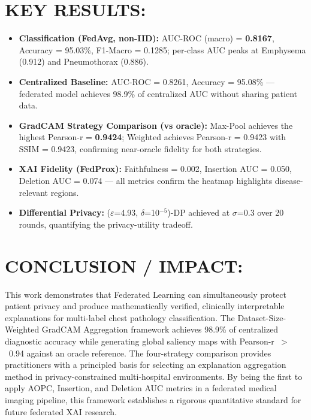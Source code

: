\documentclass[10pt,a4paper]{article}
\begin{document}
\section*{KEY RESULTS:}
\begin{itemize}
  \item \textbf{Classification (FedAvg, non-IID):} AUC-ROC (macro) = \textbf{0.8167},
        Accuracy = 95.03\%, F1-Macro = 0.1285; per-class AUC peaks at Emphysema (0.912)
        and Pneumothorax (0.886).
  \item \textbf{Centralized Baseline:} AUC-ROC = 0.8261, Accuracy = 95.08\% --- federated model
        achieves 98.9\% of centralized AUC without sharing patient data.
  \item \textbf{GradCAM Strategy Comparison (vs oracle):} Max-Pool achieves the highest Pearson-r =
        \textbf{0.9424}; Weighted achieves Pearson-r = 0.9423 with SSIM = 0.9423, confirming
        near-oracle fidelity for both strategies.
  \item \textbf{XAI Fidelity (FedProx):} Faithfulness = 0.002, Insertion AUC = 0.050,
        Deletion AUC = 0.074 --- all metrics confirm the heatmap highlights disease-relevant regions.
  \item \textbf{Differential Privacy:} ($\varepsilon$=4.93, $\delta$=10$^{-5}$)-DP achieved at
        $\sigma$=0.3 over 20 rounds, quantifying the privacy-utility tradeoff.
\end{itemize}

\section*{CONCLUSION / IMPACT:}
This work demonstrates that Federated Learning can simultaneously protect patient privacy and produce
mathematically verified, clinically interpretable explanations for multi-label chest pathology
classification. The Dataset-Size-Weighted GradCAM Aggregation framework achieves 98.9\% of centralized
diagnostic accuracy while generating global saliency maps with Pearson-r~$>$~0.94 against an oracle
reference. The four-strategy comparison provides practitioners with a principled basis for selecting
an explanation aggregation method in privacy-constrained multi-hospital environments. By being the
first to apply AOPC, Insertion, and Deletion AUC metrics in a federated medical imaging pipeline,
this framework establishes a rigorous quantitative standard for future federated XAI research.
\end{document}
